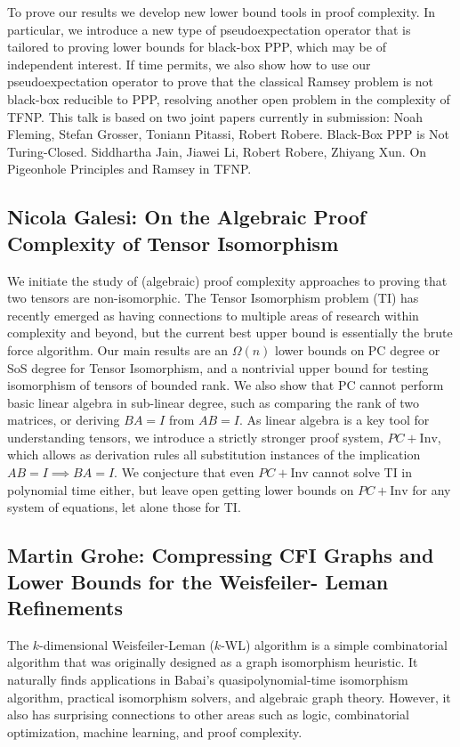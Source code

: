 \documentclass[11pt]{article}
\begin{document}
To prove our results we develop new lower bound tools in proof complexity. In particular, we introduce a new type of pseudoexpectation operator that is tailored to proving lower bounds for black-box PPP, which may be of independent interest. If time permits, we also show how to use our pseudoexpectation operator to prove that the classical Ramsey problem is not black-box reducible to PPP, resolving another open problem in the complexity of TFNP. This talk is based on two joint papers currently in submission: Noah Fleming, Stefan Grosser, Toniann Pitassi, Robert Robere. Black-Box PPP is Not Turing-Closed. Siddhartha Jain, Jiawei Li, Robert Robere, Zhiyang Xun. On Pigeonhole Principles and Ramsey in TFNP.

\subsection*{Nicola Galesi: On the Algebraic Proof Complexity of Tensor Isomorphism}\label{Galesi}

We initiate the study of (algebraic) proof complexity approaches to proving that two tensors are non-isomorphic. The Tensor Isomorphism problem (TI) has recently emerged as having connections to multiple areas of research within complexity and beyond, but the current best upper bound is essentially the brute force algorithm. 
Our main results are an $\Omega(n)$ lower bounds on PC degree or SoS degree for Tensor Isomorphism, and a nontrivial upper bound for testing isomorphism of tensors of bounded rank.
We also show that PC cannot perform basic linear algebra in sub-linear degree, such as comparing the rank of two matrices, or deriving $BA = I$ from $AB = I$. As linear algebra is a key tool for understanding tensors, we introduce a strictly stronger proof system, $PC+\mathrm{Inv}$, which allows as derivation rules all substitution instances of the implication $AB = I \implies BA = I$. We conjecture that even $PC+\mathrm{Inv}$ cannot solve TI in polynomial time either, but leave open getting lower bounds on $PC+\mathrm{Inv}$ for any system of equations, let alone those for TI. 


\subsection*{Martin Grohe: Compressing CFI Graphs and Lower Bounds for the Weisfeiler-
Leman Refinements}\label{Grohe}

The $k$-dimensional Weisfeiler-Leman ($k$-WL) algorithm is a simple combinatorial algorithm that was originally designed as a graph isomorphism heuristic. It naturally finds applications in Babai's quasipolynomial-time isomorphism algorithm, practical isomorphism solvers, and algebraic graph theory. However, it also has surprising connections to other areas such as logic, combinatorial optimization, machine learning, and proof complexity.
\end{document}
